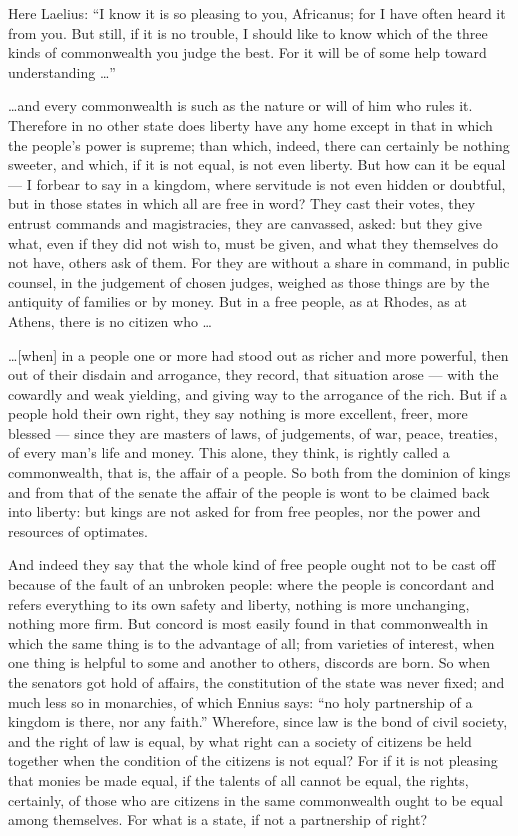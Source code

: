  Here Laelius: ``I know it is so pleasing to you, Africanus; for I have often heard it from you. But still, if it is no trouble, I should like to know which of the three kinds of commonwealth you judge the best. For it will be of some help toward understanding \ldots''

 \ldots and every commonwealth is such as the nature or will of him who rules it. Therefore in no other state does liberty have any home except in that in which the people's power is supreme; than which, indeed, there can certainly be nothing sweeter, and which, if it is not equal, is not even liberty. But how can it be equal --- I forbear to say in a kingdom, where servitude is not even hidden or doubtful, but in those states in which all are free in word? They cast their votes, they entrust commands and magistracies, they are canvassed, asked: but they give what, even if they did not wish to, must be given, and what they themselves do not have, others ask of them. For they are without a share in command, in public counsel, in the judgement of chosen judges, weighed as those things are by the antiquity of families or by money. But in a free people, as at Rhodes, as at Athens, there is no citizen who \ldots

 \ldots [when] in a people one or more had stood out as richer and more powerful, then out of their disdain and arrogance, they record, that situation arose --- with the cowardly and weak yielding, and giving way to the arrogance of the rich. But if a people hold their own right, they say nothing is more excellent, freer, more blessed --- since they are masters of laws, of judgements, of war, peace, treaties, of every man's life and money. This alone, they think, is rightly called a commonwealth, that is, the affair of a people. So both from the dominion of kings and from that of the senate the affair of the people is wont to be claimed back into liberty: but kings are not asked for from free peoples, nor the power and resources of optimates.

 And indeed they say that the whole kind of free people ought not to be cast off because of the fault of an unbroken people: where the people is concordant and refers everything to its own safety and liberty, nothing is more unchanging, nothing more firm. But concord is most easily found in that commonwealth in which the same thing is to the advantage of all; from varieties of interest, when one thing is helpful to some and another to others, discords are born. So when the senators got hold of affairs, the constitution of the state was never fixed; and much less so in monarchies, of which Ennius says: ``no holy partnership of a kingdom is there, nor any faith.'' Wherefore, since law is the bond of civil society, and the right of law is equal, by what right can a society of citizens be held together when the condition of the citizens is not equal? For if it is not pleasing that monies be made equal, if the talents of all cannot be equal, the rights, certainly, of those who are citizens in the same commonwealth ought to be equal among themselves. For what is a state, if not a partnership of right?

